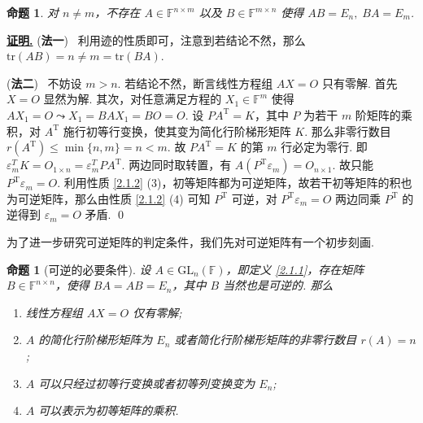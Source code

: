 \documentclass[10pt,openany]{article}
\theoremstyle{thmstyle} %
\theoremstyle{defstyle} %
\theoremstyle{prostyle} %
\newtheorem{proposition}[theorem]{命题}
\theoremstyle{exastyle}
\theoremstyle{remstyle}
\renewenvironment{proof}[1][证明]{\par\underline{\textbf{#1.}} \;\fangsong}{\qed\par}
\newcommand{\T}{^{\text{T}}}
\newcommand{\F}{\mathbb{F}}
\newcommand{\gf}{\text{GL}_n(\mathbb{F})}
\newcommand{\n}{^{n \times n}}
\newcommand{\mn}{^{m \times n}}
\newcommand{\nm}{^{n \times m}}
\newcommand{\tr}{\mathrm{tr}}
\begin{document}
\begin{proposition}\label{2.1.11}
	对 \( n \neq m \)，不存在 \( A \in \F\nm \) 以及 \( B \in \F\mn \) 使得 \( AB= E_n, \; BA=E_m \).
	
\end{proposition}

\begin{proof}
	(\textbf{法一}) \ 利用迹的性质即可，注意到若结论不然，那么 \(\tr(AB)=n \neq m=\tr(BA) \).
	
	\vspace{1ex}
	
	(\textbf{法二}) \ 不妨设 \( m>n \). 若结论不然，断言线性方程组 \( AX=O \) 只有零解. 首先 \( X=O \) 显然为解. 其次，对任意满足方程的 \( X_1 \in \F^m \) 使得 \( AX_1=O \leadsto X_1=BAX_1=BO=O \). 设 \( PA\T=K \)，其中 \( P \) 为若干 \( m \) 阶矩阵的乘积，对 \( A\T \) 施行初等行变换，使其变为简化行阶梯形矩阵 \( K \). 那么非零行数目 \( r(A\T) \leq \min\{n,m\}=n<m \). 故 \( PA\T=K \) 的第 \( m \) 行必定为零行. 即 \( \varepsilon_m^T K= O_{1 \times n}= \varepsilon_m^T PA\T \). 两边同时取转置，有 \( A(P\T\varepsilon_m)=O_{n \times 1} \). 故只能 \( P\T\varepsilon_m=O \). 利用性质 \ref{2.1.2} (3)，初等矩阵都为可逆矩阵，故若干初等矩阵的积也为可逆矩阵，那么由性质 \ref{2.1.2} (4) 可知 \( P\T \) 可逆，对  \( P\T\varepsilon_m=O \) 两边同乘 \( P\T \) 的逆得到 \( \varepsilon_m=O \) 矛盾.
\end{proof}

为了进一步研究可逆矩阵的判定条件，我们先对可逆矩阵有一个初步刻画.

\begin{proposition}[可逆的必要条件]\label{2.1.12}
	设 \( A \in \gf \)，即定义 \ref{2.1.1}，存在矩阵 \( B \in \F\n \)，使得 \( BA=AB=E_n \)，其中 \( B \) 当然也是可逆的. 那么
	\begin{enumerate}[(1)]
		\item 线性方程组 \( AX=O \) 仅有零解;
		\item \( A \) 的简化行阶梯形矩阵为 \( E_n \) 或者简化行阶梯形矩阵的非零行数目 \( r(A)=n \);
		\item \( A \) 可以只经过初等行变换或者初等列变换变为 \( E_n \);
		\item \( A \) 可以表示为初等矩阵的乘积.
	\end{enumerate}
	
\end{proposition}
\end{document}
